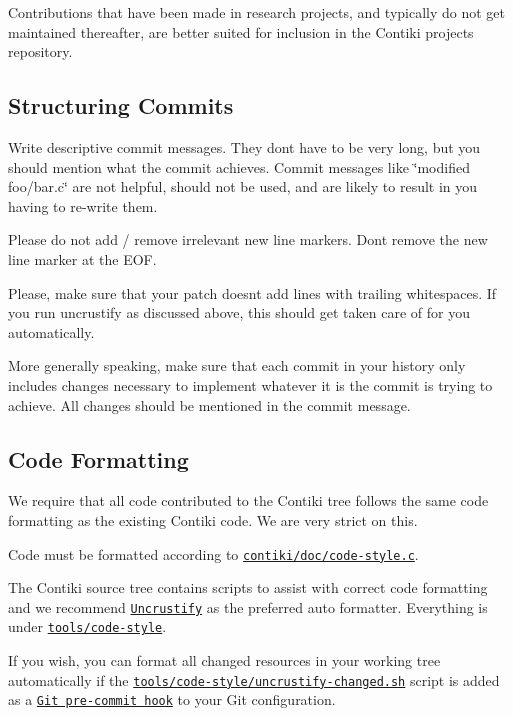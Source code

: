 Contributions that have been made in research projects, and typically do not get maintained thereafter, are better suited for inclusion in the Contiki projects repository.

\subsection*{Structuring Commits }


\begin{DoxyItemize}
\item Write descriptive commit messages. They don\textquotesingle{}t have to be very long, but you should mention what the commit achieves. Commit messages like \char`\"{}modified foo/bar.\+c\char`\"{} are not helpful, should not be used, and are likely to result in you having to re-\/write them.
\item Please do not add / remove irrelevant new line markers. Don\textquotesingle{}t remove the new line marker at the E\+O\+F.
\item Please, make sure that your patch doesn\textquotesingle{}t add lines with trailing whitespaces. If you run uncrustify as discussed above, this should get taken care of for you automatically.
\item More generally speaking, make sure that each commit in your history only includes changes necessary to implement whatever it is the commit is trying to achieve. All changes should be mentioned in the commit message.
\end{DoxyItemize}

\subsection*{Code Formatting }

We require that all code contributed to the Contiki tree follows the same code formatting as the existing Contiki code. We are very strict on this.

Code must be formatted according to \href{https://github.com/contiki-os/contiki/blob/master/doc/code-style.c}{\tt contiki/doc/code-\/style.\+c}.

The Contiki source tree contains scripts to assist with correct code formatting and we recommend \href{http://uncrustify.sourceforge.net/}{\tt Uncrustify} as the preferred auto formatter. Everything is under \href{https://github.com/contiki-os/contiki/tree/master/tools/code-style}{\tt tools/code-\/style}.

If you wish, you can format all changed resources in your working tree automatically if the \href{https://github.com/contiki-os/contiki/blob/master/tools/code-style/uncrustify-changed.sh}{\tt tools/code-\/style/uncrustify-\/changed.\+sh} script is added as a \href{http://git-scm.com/book/en/Customizing-Git-Git-Hooks}{\tt Git pre-\/commit hook} to your Git configuration.

